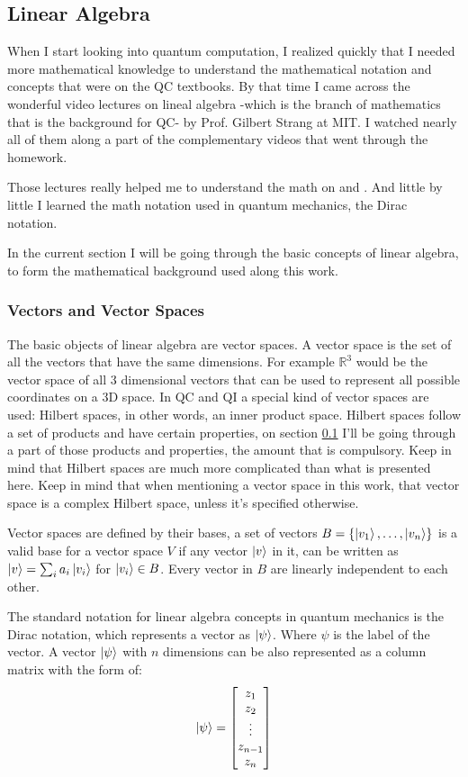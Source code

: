 \subsection{Linear Algebra}\label{algebra}
When I start looking into quantum computation, I realized quickly that I needed more mathematical knowledge to understand the mathematical notation and concepts that were on the QC textbooks. By that time I came across the wonderful video lectures on lineal algebra -which is the branch of mathematics that is the background for QC- by Prof. Gilbert Strang at MIT. I watched nearly all of them along a part of the complementary videos that went through the homework. 

Those lectures really helped me to understand the math on \tocite and \tocite. And little by little I learned the math notation used in quantum mechanics, the Dirac notation.

In the current section I will be going through the basic concepts of linear algebra, to form the mathematical background used along this work. 

	\subsubsection{Vectors and Vector Spaces}
The basic objects of linear algebra are vector spaces. A vector space is the set of all the vectors that have the same dimensions. For example $\mathbb{R}^{3}$ would be the vector space of all 3 dimensional vectors that can be used to represent all possible coordinates on a 3D space. In QC and QI a special kind of vector spaces are used: Hilbert spaces, in other words, an inner product space. Hilbert spaces follow a set of products and have certain properties, on section \ref{algebra} I'll be going through a part of those products and properties, the amount that is compulsory. Keep in mind that Hilbert spaces are much more complicated than what is presented here. Keep in mind that when mentioning a vector space in this work, that vector space is a complex Hilbert space, unless it's specified otherwise.

Vector spaces are defined by their bases, a set of vectors $B = \{\ket{v_1}, \dots, \ket{v_n}\}$ is a valid base for a vector space $V$ if any vector $\ket{v}$ in it, can be written as $\ket{v} = \sum_i a_i \ket{v_i}$ for $\ket{v_i} \in B$. Every vector in $B$ are linearly independent to each other.


The standard notation for linear algebra concepts in quantum mechanics is the Dirac notation, which represents a vector as $ \ket{\psi} $. Where $\psi$ is the label of the vector. A vector $ \ket{\psi} $ with $n$ dimensions can be also represented as a column matrix with the form of:
$$
\ket{\psi} = 
\begin{bmatrix}
	z_{1} \\
	z_{2} \\
	\vdots \\
	z_{n-1} \\
	z_{n}
\end{bmatrix}
$$

